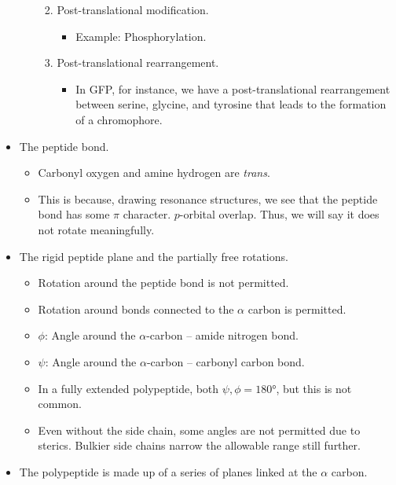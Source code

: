 \documentclass[../notes.tex]{subfiles}
\begin{document}
\begin{itemize}
\begin{itemize}
\begin{enumerate}
\begin{itemize}
            \end{itemize}
            \item Post-translational modification.
            \begin{itemize}
                \item Example: Phosphorylation.
            \end{itemize}
            \item Post-translational rearrangement.
            \begin{itemize}
                \item In GFP, for instance, we have a post-translational rearrangement between serine, glycine, and tyrosine that leads to the formation of a chromophore.
            \end{itemize}
        \end{enumerate}
    \end{itemize}
    \item The peptide bond.
    \begin{itemize}
        \item Carbonyl oxygen and amine hydrogen are \emph{trans}.
        \item This is because, drawing resonance structures, we see that the peptide  bond has some $\pi$ character. $p$-orbital overlap. Thus, we will say it does not rotate meaningfully.
    \end{itemize}
    \item The rigid peptide plane and the partially free rotations.
    \begin{itemize}
        \item Rotation around the peptide bond is not permitted.
        \item Rotation around bonds connected to the $\alpha$ carbon is permitted.
        \item $\phi$: Angle around the $\alpha$-carbon -- amide nitrogen bond.
        \item $\psi$: Angle around the $\alpha$-carbon -- carbonyl carbon bond.
        \item In a fully extended polypeptide, both $\psi,\phi=\ang{180}$, but this is not common.
        \item Even without the side chain, some angles are not permitted due to sterics. Bulkier side chains narrow the allowable range still further.
    \end{itemize}
    \item The polypeptide is made up of a series of planes linked at the $\alpha$ carbon.

\end{itemize}
\end{document}
